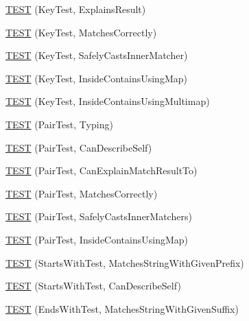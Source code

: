 \begin{DoxyCompactItemize}
\item 
\hyperlink{namespacetesting_1_1gmock__matchers__test_a38169c972e14fef59a41e532fb5b431e}{T\+E\+ST} (Key\+Test, Explains\+Result)
\item 
\hyperlink{namespacetesting_1_1gmock__matchers__test_a39f4f76617c414ab715b701eb82eeee4}{T\+E\+ST} (Key\+Test, Matches\+Correctly)
\item 
\hyperlink{namespacetesting_1_1gmock__matchers__test_a6b05d274d57a4aa120bb497c34ce3a68}{T\+E\+ST} (Key\+Test, Safely\+Casts\+Inner\+Matcher)
\item 
\hyperlink{namespacetesting_1_1gmock__matchers__test_af9f4e295413489a7e3acafc59584c3c4}{T\+E\+ST} (Key\+Test, Inside\+Contains\+Using\+Map)
\item 
\hyperlink{namespacetesting_1_1gmock__matchers__test_af90ca00690094484af6c34eadf4dd7c3}{T\+E\+ST} (Key\+Test, Inside\+Contains\+Using\+Multimap)
\item 
\hyperlink{namespacetesting_1_1gmock__matchers__test_a5689064ea3fe50424dd1ea036d107aa8}{T\+E\+ST} (Pair\+Test, Typing)
\item 
\hyperlink{namespacetesting_1_1gmock__matchers__test_a672ba279448f634fae495ed7dc9260bd}{T\+E\+ST} (Pair\+Test, Can\+Describe\+Self)
\item 
\hyperlink{namespacetesting_1_1gmock__matchers__test_a4ee8f3967e3658cd7bd340558922f131}{T\+E\+ST} (Pair\+Test, Can\+Explain\+Match\+Result\+To)
\item 
\hyperlink{namespacetesting_1_1gmock__matchers__test_acdb02e9ac603c91b35602751f6a81239}{T\+E\+ST} (Pair\+Test, Matches\+Correctly)
\item 
\hyperlink{namespacetesting_1_1gmock__matchers__test_ad2110445fe8f2f8ca947540f2a400228}{T\+E\+ST} (Pair\+Test, Safely\+Casts\+Inner\+Matchers)
\item 
\hyperlink{namespacetesting_1_1gmock__matchers__test_a9785412a9e786b1f81387204df577c73}{T\+E\+ST} (Pair\+Test, Inside\+Contains\+Using\+Map)
\item 
\hyperlink{namespacetesting_1_1gmock__matchers__test_ac8a66c592ff57cce28b6f1d5211fd370}{T\+E\+ST} (Starts\+With\+Test, Matches\+String\+With\+Given\+Prefix)
\item 
\hyperlink{namespacetesting_1_1gmock__matchers__test_a492143bbe0627c563c5d0c65bf3f4d5b}{T\+E\+ST} (Starts\+With\+Test, Can\+Describe\+Self)
\item 
\hyperlink{namespacetesting_1_1gmock__matchers__test_ac3d41540d2ae7956d33c9eae1be67d91}{T\+E\+ST} (Ends\+With\+Test, Matches\+String\+With\+Given\+Suffix)

\end{DoxyCompactItemize}
